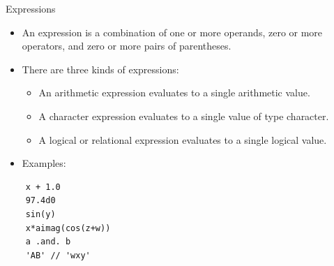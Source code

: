 \documentclass[c,mathserif,compress,xcolor=svgnames]{beamer}
\begin{document}
\begin{frame}[fragile]{Expressions}
  \begin{itemize}
    \item An expression is a combination of one or more operands, zero or more operators, and zero or more pairs of parentheses.
    \item There are three kinds of expressions:
      \begin{itemize}
        \item An arithmetic expression evaluates to a single arithmetic value.
        \item A character expression evaluates to a single value of type character.
        \item A logical or relational expression evaluates to a single logical value.
      \end{itemize}
    \item Examples:
  \end{itemize}
  \begin{lstlisting}
    x + 1.0 
    97.4d0 
    sin(y) 
    x*aimag(cos(z+w)) 
    a .and. b 
    'AB' // 'wxy'
  \end{lstlisting}
\end{frame}
\end{document}

